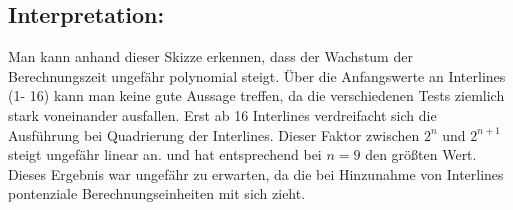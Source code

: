 \documentclass[fleqn]{article}
\begin{document}

\subsection{Interpretation:}
Man kann anhand dieser Skizze erkennen, dass der Wachstum der
Berechnungszeit ungefähr polynomial steigt. Über die Anfangswerte an
Interlines (1- 16) kann man keine gute Aussage treffen, da die
verschiedenen Tests ziemlich stark voneinander ausfallen. Erst ab 16
Interlines verdreifacht sich die Ausführung bei Quadrierung der
Interlines. Dieser Faktor zwischen  $2^{n}$ und $2^{n+1}$ steigt
ungefähr linear an. und hat entsprechend bei $n=9$ den größten Wert.
Dieses Ergebnis war ungefähr zu erwarten, da die bei Hinzunahme von
Interlines pontenziale Berechnungseinheiten mit sich zieht. 
 
\end{document}

